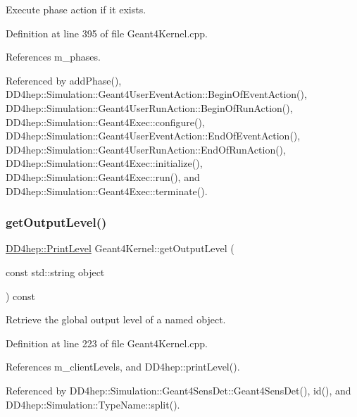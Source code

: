 Execute phase action if it exists. 



Definition at line 395 of file Geant4\+Kernel.\+cpp.



References m\+\_\+phases.



Referenced by add\+Phase(), D\+D4hep\+::\+Simulation\+::\+Geant4\+User\+Event\+Action\+::\+Begin\+Of\+Event\+Action(), D\+D4hep\+::\+Simulation\+::\+Geant4\+User\+Run\+Action\+::\+Begin\+Of\+Run\+Action(), D\+D4hep\+::\+Simulation\+::\+Geant4\+Exec\+::configure(), D\+D4hep\+::\+Simulation\+::\+Geant4\+User\+Event\+Action\+::\+End\+Of\+Event\+Action(), D\+D4hep\+::\+Simulation\+::\+Geant4\+User\+Run\+Action\+::\+End\+Of\+Run\+Action(), D\+D4hep\+::\+Simulation\+::\+Geant4\+Exec\+::initialize(), D\+D4hep\+::\+Simulation\+::\+Geant4\+Exec\+::run(), and D\+D4hep\+::\+Simulation\+::\+Geant4\+Exec\+::terminate().

\hypertarget{class_d_d4hep_1_1_simulation_1_1_geant4_kernel_adcf47e98a5cff7d2ddf235753f907a63}{}\label{class_d_d4hep_1_1_simulation_1_1_geant4_kernel_adcf47e98a5cff7d2ddf235753f907a63} 
\subsubsection{\texorpdfstring{get\+Output\+Level()}{getOutputLevel()}}
{\footnotesize\ttfamily \hyperlink{namespace_d_d4hep_a5b5a64d56252469451f2020a27d57d42}{D\+D4hep\+::\+Print\+Level} Geant4\+Kernel\+::get\+Output\+Level (\begin{DoxyParamCaption}\item[{const std\+::string}]{object }\end{DoxyParamCaption}) const}



Retrieve the global output level of a named object. 



Definition at line 223 of file Geant4\+Kernel.\+cpp.



References m\+\_\+client\+Levels, and D\+D4hep\+::print\+Level().



Referenced by D\+D4hep\+::\+Simulation\+::\+Geant4\+Sens\+Det\+::\+Geant4\+Sens\+Det(), id(), and D\+D4hep\+::\+Simulation\+::\+Type\+Name\+::split().

